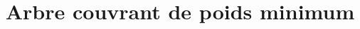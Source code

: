 \documentclass{beamer}
\begin{document}
\title{Arbre couvrant de poids minimum}

\begin{frame}
    \titlepage
\end{frame}





\end{document}
